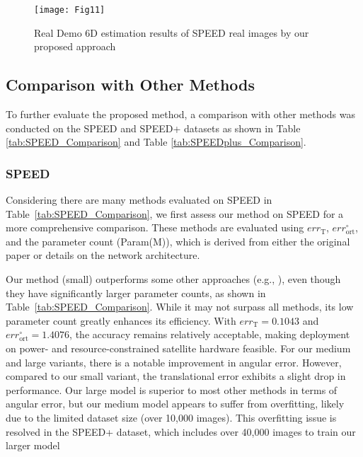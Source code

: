 \documentclass[a4paper,fleqn]{cas-sc}
\begin{document}
\begin{figure*}[htbp]
	\centering
	\texttt{[image: Fig11]} 
	\caption{Real Demo 6D estimation results of SPEED real images by our proposed approach}
	\label{fig:realdemo}
\end{figure*}

\subsection{Comparison with Other Methods}
To further evaluate the proposed method, a comparison with other methods was conducted on the SPEED and SPEED+ datasets as shown in Table \ref{tab:SPEED_Comparison} and Table \ref{tab:SPEEDplus_Comparison}.

\subsubsection{SPEED}
Considering there are many methods evaluated on SPEED in Table~\ref{tab:SPEED_Comparison}, we first assess our method on SPEED for a more comprehensive comparison. These methods are evaluated using $err_{\text{T}}$, $err_{\text{ort}}^{\circ}$, and the parameter count (Param(M)), which is derived from either the original paper or details on the network architecture. 

Our method (small) outperforms some other approaches (e.g., \citet{chen2019satellite, piazza2021deep}), even though they have significantly larger parameter counts, as shown in Table~\ref{tab:SPEED_Comparison}. While it may not surpass all methods, its low parameter count greatly enhances its efficiency. With $err_{\text{T}} = 0.1043$ and $err_{\text{ort}}^{\circ} = 1.4076$, the accuracy remains relatively acceptable, making deployment on power- and resource-constrained satellite hardware feasible. 
For our medium and large variants, there is a notable improvement in angular error. However, compared to our small variant, the translational error exhibits a slight drop in performance. Our large model is superior to most other methods in terms of angular error, but our medium model appears to suffer from overfitting, likely due to the limited dataset size (over 10,000 images). This overfitting issue is resolved in the SPEED+ dataset, which includes over 40,000 images to train our larger model
\end{document}
